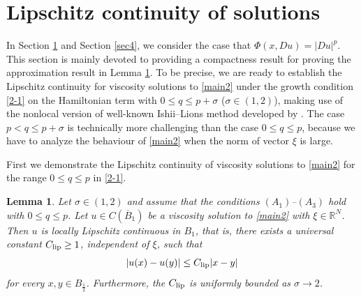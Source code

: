 \documentclass[11pt,reqno]{amsart}
\numberwithin{equation}{section}
\newtheorem{lemma}[theorem]{Lemma}
\begin{document}
\section{Lipschitz continuity of solutions}
\label{sec3}

In Section \ref{sec3} and Section \ref{sec4}, we consider the case that $\Phi(x,Du)=|Du|^p$. This section is mainly devoted to providing a compactness result for proving the approximation result in Lemma \ref{lem3-1}. To be precise, we are ready to establish the Lipschitz continuity for viscosity solutions to \eqref{main2} under the growth condition \eqref{2-1} on the Hamiltonian term with $0\le q\le p+\sigma$ ($\sigma\in(1,2)$), making use of the nonlocal version of well-known Ishii--Lions method developed by \cite{BCCI12, BCI11}. The case $p<q\le p+\sigma$ is technically more challenging than the case $0\le q\le p$, %
because we have to analyze the behaviour of \eqref{main2} when the norm of vector $\xi$ is large.

First we demonstrate the Lipschitz continuity of viscosity solutions to \eqref{main2} for the range $0\le q\le p$ in \eqref{2-1}.

\begin{lemma}
\label{lem3-1}
Let $\sigma\in(1,2)$ and assume that the conditions $(A_1)$--$(A_3)$ hold with $0\le q\le p$. Let $u\in C(\overline{B}_1)$ be a viscosity solution to \eqref{main2} with $\xi\in\mathbb{R}^N$. Then $u$ is locally Lipschitz continuous in $B_1$, that is, there exists a universal constant $C_{\rm lip}\ge1$, independent of $\xi$, such that
$$
|u(x)-u(y)|\le C_{\rm lip}|x-y|
$$
for every $x,y\in B_{\frac12}$. Furthermore, the $C_{\rm lip}$ is uniformly bounded as $\sigma\rightarrow2$.
\end{lemma}
\end{document}
